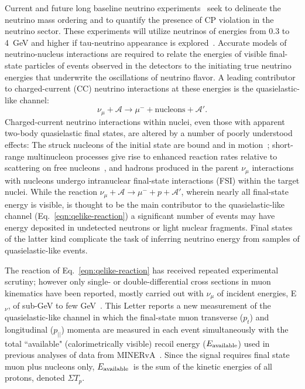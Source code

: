 \documentclass[aps,prl,twocolumn,showpacs,superscriptaddress, floatfix]{revtex4-2}  %
\newcommand{\pt}{\ensuremath{p_{t}}}
\newcommand{\pz}{\ensuremath{p_{||}}}
\newcommand{\eavail}{\ensuremath{E_{\rm\scriptstyle available}}}
\newcommand{\sumtp}{\ensuremath{\Sigma T_{p}}}
\begin{document}
Current and future long baseline neutrino experiments~\cite{Abe:2015awa,Adamson:2016tbq,Acciarri:2015uup,Abe:2011ts} seek to delineate the neutrino mass ordering and to quantify the presence of  CP violation in the neutrino sector.  These experiments will utilize neutrinos of energies from 0.3 to 4~GeV and higher if tau-neutrino appearance is explored~\cite{DeGouvea:2019kea}.
Accurate models of neutrino-nucleus interactions are required to relate the energies of visible final-state particles of events observed in the detectors to the initiating true neutrino energies that underwrite the oscillations of neutrino flavor. A leading contributor to charged-current (CC) neutrino interactions at these energies is the quasielastic-like channel: 
\begin{equation}
\label{signal-channel}
\nu_{\mu}+\mathcal{A}\rightarrow\mu^{-}+\textrm{nucleons} + \mathcal{A'.}
\label{eqn:qelike-reaction}
\end{equation}
\noindent
Charged-current neutrino interactions within nuclei, even those with apparent two-body quasielastic final states, are altered by a number of poorly understood effects: The struck nucleons of the initial state are bound and in motion~\cite{Moniz:1971mt,Benhar:1994hw}; short-range multinucleon processes give rise to enhanced reaction rates relative to scattering on free nucleons~\cite{Marteau:1999kt,Martini:2010ex,Nieves:2011pp,Gran:2013kda,Fiorentini:2013ezn,Rodrigues:2015hik}, and hadrons produced in the parent $\nu_{\mu}$ 
interactions with nucleons undergo intranuclear final-state interactions (FSI) within the target nuclei.  While the reaction $\nu_{\mu}+\mathcal{A}\rightarrow\mu^{-}+ p + \mathcal{A'}$,
wherein nearly all final-state energy is visible, is thought to be the main
contributor to the quasielastic-like channel (Eq.~\ref{eqn:qelike-reaction}) a significant number of events may have
energy deposited in undetected neutrons or light nuclear fragments. 
Final states of the latter kind complicate the task of inferring neutrino energy 
from samples of quasielastic-like events.

The reaction of Eq.~\ref{eqn:qelike-reaction} has received repeated experimental scrutiny; however only single- or double-differential cross sections in muon kinematics have been reported, mostly carried out
with $\nu_{\mu}$ of incident energies, E$_{\nu}$, of sub-GeV to few GeV~\cite{Gran:2006jn,MiniBooNE:2010bsu,MINERvA:2013kdn,MINERvA:2014ypj,MINOS:2014axb,T2K:2014hih,T2K:2015ujp,T2K:2016jor,T2K:2017qxv,MINERvA:2017dzh,MINERvA:2018hba,MINERvA:2018hqn,T2K:2018rnz,MINERvA:2019ope,MINERvA:2019gsf,T2K:2020jav,MicroBooNE:2020akw,MicroBooNE:2020fxd}.  This Letter
reports a new measurement of the quasielastic-like channel in which the final-state 
muon transverse (\pt) and longitudinal (\pz) momenta are measured in each event simultaneously
with the total ``available" (calorimetrically visible) recoil energy (\eavail) used in previous analyses of data from MINERvA~\cite{Rodrigues:2015hik,MINERvA:2018nab,MINERvA:2021wjs}.
Since the signal requires final state muon plus nucleons only, \eavail\ is  the sum of the kinetic energies of all protons, denoted \sumtp.
\end{document}
